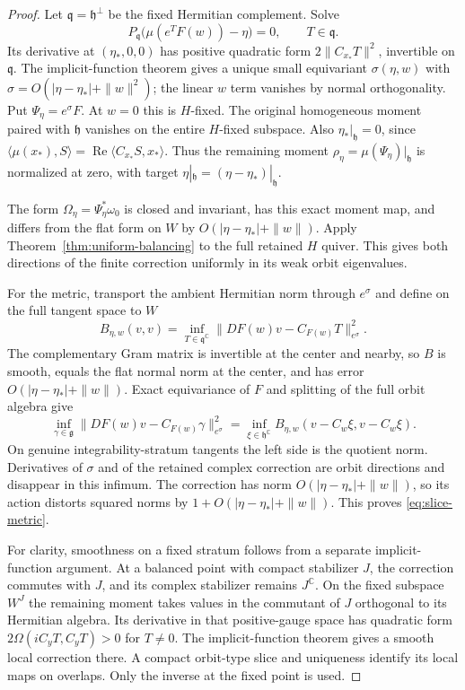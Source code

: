 \begin{proof}
Let $\mathfrak q=\mathfrak h^\perp$ be the fixed Hermitian complement.
Solve
\[
 P_{\mathfrak q}\bigl(\mu(e^TF(w))-\eta\bigr)=0,\qquad
 T\in\mathfrak q.
\]
Its derivative at $(\eta_*,0,0)$ has positive quadratic form
$2\|C_{x_*}T\|^2$, invertible on $\mathfrak q$.
The implicit-function theorem gives a unique small equivariant
$\sigma(\eta,w)$ with
$\sigma=O(|\eta-\eta_*|+\|w\|^2)$; the linear $w$ term vanishes
by normal orthogonality. Put $\Psi_\eta=e^\sigma F$.
At $w=0$ this is $H$-fixed. The original homogeneous moment paired
with $\mathfrak h$ vanishes on the entire $H$-fixed subspace.
Also $\eta_*|_{\mathfrak h}=0$, since
$\langle\mu(x_*),S\rangle=\operatorname{Re}\langle C_{x_*}S,x_*\rangle$.
Thus the remaining moment $\rho_\eta=\mu(\Psi_\eta)|_{\mathfrak h}$
is normalized at zero, with target
$\eta|_{\mathfrak h}=(\eta-\eta_*)|_{\mathfrak h}$.

The form $\Omega_\eta=\Psi_\eta^*\omega_0$ is closed and invariant,
has this exact moment map, and differs from the flat form on $W$ by
$O(|\eta-\eta_*|+\|w\|)$. Apply
Theorem~\ref{thm:uniform-balancing} to the full retained $H$ quiver.
This gives both directions of the finite correction uniformly in its
weak orbit eigenvalues.

For the metric, transport the ambient Hermitian norm through
$e^\sigma$ and define on the full tangent space to $W$
\[
 B_{\eta,w}(v,v)=
 \inf_{T\in\mathfrak q^{\mathbb C}}
       \|DF(w)v-C_{F(w)}T\|_{e^\sigma}^2.
\]
The complementary Gram matrix is invertible at the center and nearby,
so $B$ is smooth, equals the flat normal norm at the center, and has
error $O(|\eta-\eta_*|+\|w\|)$.
Exact equivariance of $F$ and splitting of the full orbit algebra give
\[
 \inf_{\gamma\in\mathfrak g}
       \|DF(w)v-C_{F(w)}\gamma\|_{e^\sigma}^2
 =\inf_{\xi\in\mathfrak h^{\mathbb C}}
       B_{\eta,w}(v-C_w\xi,v-C_w\xi).
\]
On genuine integrability-stratum tangents the left side is the
quotient norm. Derivatives of $\sigma$ and of the retained complex
correction are orbit directions and disappear in this infimum.
The correction has norm $O(|\eta-\eta_*|+\|w\|)$, so its action
distorts squared norms by $1+O(|\eta-\eta_*|+\|w\|)$.
This proves \eqref{eq:slice-metric}.

For clarity, smoothness on a fixed stratum follows from a separate
implicit-function argument. At a balanced point with compact
stabilizer $J$, the correction commutes with $J$, and its complex
stabilizer remains $J^{\mathbb C}$. On the fixed subspace $W^J$ the
remaining moment takes values in the commutant of $J$ orthogonal to
its Hermitian algebra. Its derivative in that positive-gauge space has
quadratic form $2\Omega(iC_yT,C_yT)>0$ for $T\ne0$.
The implicit-function theorem gives a smooth local correction there.
A compact orbit-type slice and uniqueness identify its local maps
on overlaps. Only the inverse at the fixed point is used.


\end{proof}
